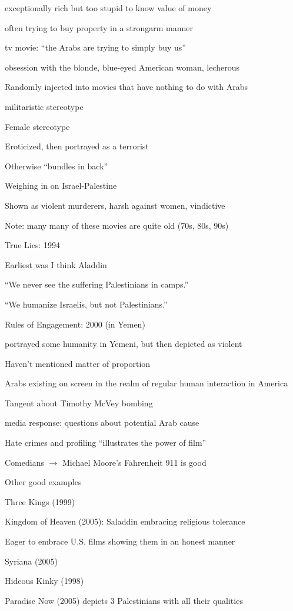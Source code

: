 \documentclass[12pt]{article}
\begin{document}
exceptionally rich but too stupid to know value of money

often trying to buy property in a strongarm manner

tv movie: ``the Arabs are trying to simply buy us''

obsession with the blonde, blue-eyed American woman, lecherous

\noindent
Randomly injected into movies that have nothing to do with Arabs

militaristic stereotype

\noindent
Female stereotype

Eroticized, then portrayed as a terrorist

Otherwise ``bundles in back''

\noindent
Weighing in on Israel-Palestine

Shown as violent murderers, harsh against women, vindictive

\noindent
Note: many many of these movies are quite old (70s, 80s, 90s)

True Lies: 1994

Earliest was I think Aladdin

\noindent
``We never see the suffering Palestinians in camps.''

``We humanize Israelis, but not Palestinians.''

\noindent
Rules of Engagement: 2000 (in Yemen)

portrayed some humanity in Yemeni, but then depicted as violent

\noindent
Haven't mentioned matter of proportion

Arabs existing on screen in the realm of regular human interaction in America

\noindent
Tangent about Timothy McVey bombing

media response: questions about potential Arab cause

\noindent
Hate crimes and profiling ``illustrates the power of film''

\noindent
Comedians $\to$ Michael Moore's Fahrenheit 911 is good

\noindent
Other good examples

Three Kings (1999)

Kingdom of Heaven (2005): Saladdin embracing religious tolerance

Eager to embrace U.S. films showing them in an honest manner

Syriana (2005)

Hideous Kinky (1998)

Paradise Now (2005) depicts 3 Palestinians with all their qualities
\end{document}
